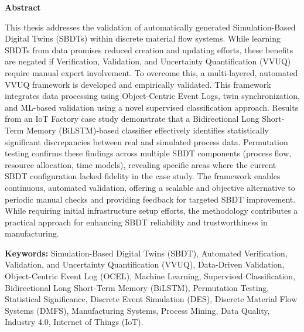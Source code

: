 \thispagestyle{plain} %

\vspace*{1.5in} %

\begin{center}
  {\Large \textbf{Abstract}}
\end{center}

This thesis addresses the validation of automatically generated Simulation-Based Digital Twins (SBDTs) within discrete material flow systems. While learning SBDTs from data promises reduced creation and updating efforts, these benefits are negated if Verification, Validation, and Uncertainty Quantification (VVUQ) require manual expert involvement. To overcome this, a multi-layered, automated VVUQ framework is developed and empirically validated. This framework integrates data processing using Object-Centric Event Logs, twin synchronization, and ML-based validation using a novel supervised classification approach. Results from an IoT Factory case study demonstrate that a Bidirectional Long Short-Term Memory (BiLSTM)-based classifier effectively identifies statistically significant discrepancies between real and simulated process data. Permutation testing confirms these findings across multiple SBDT components (process flow, resource allocation, time models), revealing specific areas where the current SBDT configuration lacked fidelity in the case study. The framework enables continuous, automated validation, offering a scalable and objective alternative to periodic manual checks and providing feedback for targeted SBDT improvement. While requiring initial infrastructure setup efforts, the methodology contributes a practical approach for enhancing SBDT reliability and trustworthiness in manufacturing.

\vspace{0.3in}

\textbf{Keywords:} Simulation-Based Digital Twins (SBDT), Automated Verification, Validation, and Uncertainty Quantification (VVUQ), Data-Driven Validation, Object-Centric Event Log (OCEL), Machine Learning, Supervised Classification, Bidirectional Long Short-Term Memory (BiLSTM), Permutation Testing, Statistical Significance, Discrete Event Simulation (DES), Discrete Material Flow Systems (DMFS), Manufacturing Systems, Process Mining, Data Quality, Industry 4.0, Internet of Things (IoT).

\clearpage